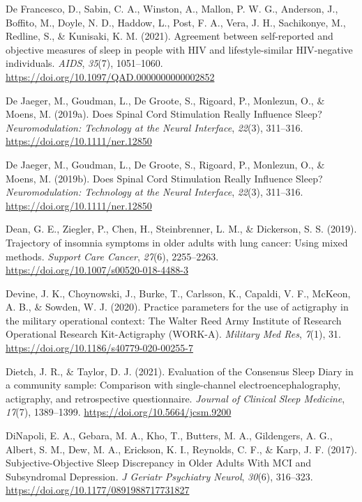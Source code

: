 \documentclass[
]{article}
\newlength{\cslhangindent}
\newenvironment{CSLReferences}[2] %
 {\begin{list}{}{%
  \setlength{\itemindent}{0pt}
  \setlength{\leftmargin}{0pt}
  \setlength{\parsep}{0pt}
  \ifodd #1
   \setlength{\leftmargin}{\cslhangindent}
   \setlength{\itemindent}{-1\cslhangindent}
  \fi
  \setlength{\itemsep}{#2\baselineskip}}}
 {\end{list}}
\begin{document}
\begin{CSLReferences}{1}{0}
De Francesco, D., Sabin, C. A., Winston, A., Mallon, P. W. G., Anderson, J., Boffito, M., Doyle, N. D., Haddow, L., Post, F. A., Vera, J. H., Sachikonye, M., Redline, S., \& Kunisaki, K. M. (2021). Agreement between self-reported and objective measures of sleep in people with {HIV} and lifestyle-similar {HIV}-negative individuals. \emph{AIDS}, \emph{35}(7), 1051--1060. \url{https://doi.org/10.1097/QAD.0000000000002852}

De Jaeger, M., Goudman, L., De Groote, S., Rigoard, P., Monlezun, O., \& Moens, M. (2019a). Does {Spinal} {Cord} {Stimulation} {Really} {Influence} {Sleep}? \emph{Neuromodulation: Technology at the Neural Interface}, \emph{22}(3), 311--316. \url{https://doi.org/10.1111/ner.12850}

De Jaeger, M., Goudman, L., De Groote, S., Rigoard, P., Monlezun, O., \& Moens, M. (2019b). Does {Spinal} {Cord} {Stimulation} {Really} {Influence} {Sleep}? \emph{Neuromodulation: Technology at the Neural Interface}, \emph{22}(3), 311--316. \url{https://doi.org/10.1111/ner.12850}

Dean, G. E., Ziegler, P., Chen, H., Steinbrenner, L. M., \& Dickerson, S. S. (2019). Trajectory of insomnia symptoms in older adults with lung cancer: Using mixed methods. \emph{Support Care Cancer}, \emph{27}(6), 2255--2263. \url{https://doi.org/10.1007/s00520-018-4488-3}

Devine, J. K., Choynowski, J., Burke, T., Carlsson, K., Capaldi, V. F., McKeon, A. B., \& Sowden, W. J. (2020). Practice parameters for the use of actigraphy in the military operational context: The {Walter} {Reed} {Army} {Institute} of {Research} {Operational} {Research} {Kit}-{Actigraphy} ({WORK}-{A}). \emph{Military Med Res}, \emph{7}(1), 31. \url{https://doi.org/10.1186/s40779-020-00255-7}

Dietch, J. R., \& Taylor, D. J. (2021). Evaluation of the {Consensus} {Sleep} {Diary} in a community sample: Comparison with single-channel electroencephalography, actigraphy, and retrospective questionnaire. \emph{Journal of Clinical Sleep Medicine}, \emph{17}(7), 1389--1399. \url{https://doi.org/10.5664/jcsm.9200}

DiNapoli, E. A., Gebara, M. A., Kho, T., Butters, M. A., Gildengers, A. G., Albert, S. M., Dew, M. A., Erickson, K. I., Reynolds, C. F., \& Karp, J. F. (2017). Subjective-{Objective} {Sleep} {Discrepancy} in {Older} {Adults} {With} {MCI} and {Subsyndromal} {Depression}. \emph{J Geriatr Psychiatry Neurol}, \emph{30}(6), 316--323. \url{https://doi.org/10.1177/0891988717731827}


\end{CSLReferences}
\end{document}
